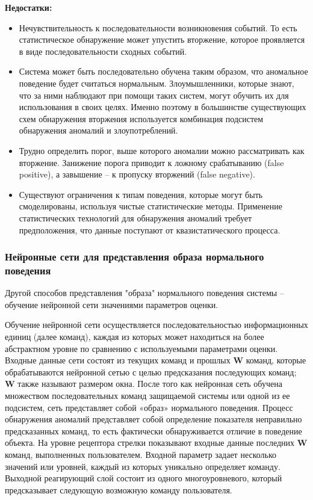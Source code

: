 \textbf{Недостатки:}
\begin{itemize}
	\item Нечувствительность к последовательности возникновения событий.
	То есть статистическое обнаружение может упустить вторжение,
	которое проявляется в виде последовательности сходных событий.

	\item Система может быть последовательно обучена таким образом, что аномальное поведение
	будет считаться нормальным. Злоумышленники, которые знают, что за ними наблюдают
	при помощи таких систем, могут обучить их для использования в своих целях. Именно поэтому в
	большинстве существующих схем обнаружения вторжения используется комбинация подсистем
	обнаружения аномалий и злоупотреблений.

	\item Трудно определить порог, выше которого аномалии можно рассматривать как вторжение.
	Занижение порога приводит к ложному срабатыванию (false positive), а завышение – к пропуску вторжений (false negative).

	\item Существуют ограничения к типам поведения, которые могут быть смоделированы,
	используя чистые статистические методы. Применение статистических технологий для
	обнаружения аномалий требует предположения, что данные поступают от квазистатического процесса.
\end{itemize}
\autocite{IntrusionDetection}



\subsubsection{Нейронные сети для представления образа нормального поведения}
Другой способов представления "образа" нормального поведения системы – обучение нейронной
сети значениями параметров оценки.

Обучение нейронной сети осуществляется последовательностью информационных единиц (далее команд),
каждая из которых может находиться на более абстрактном уровне по сравнению с используемыми
параметрами оценки. Входные данные сети состоят из текущих команд и прошлых \textbf{W} команд, которые
обрабатываются нейронной сетью с целью предсказания последующих команд; \textbf{W} также называют размером
окна. После того как нейронная сеть обучена множеством последовательных команд защищаемой системы или
одной из ее подсистем, сеть представляет собой «образ» нормального поведения. Процесс обнаружения
аномалий представляет собой определение показателя неправильно предсказанных команд,
то есть фактически обнаруживается отличие в поведение объекта. На уровне рецептора стрелки
показывают входные данные последних \textbf{W} команд, выполненных пользователем. Входной параметр задает
несколько значений или уровней, каждый из которых уникально определяет команду. Выходной реагирующий
слой состоит из одного многоуровневого, который предсказывает следующую возможную команду пользователя.
\autocite{BeynonDavies}

